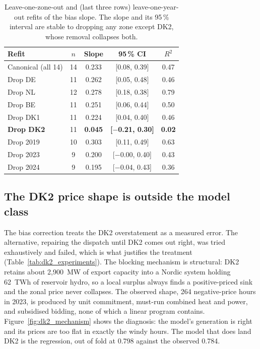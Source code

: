 \begin{table}[!htb]
\centering\small
\caption{Leave-one-zone-out and (last three rows) leave-one-year-out refits of
the bias slope. The slope and its 95\,\% interval are stable to dropping any zone
except DK2, whose removal collapses both.}
\label{tab:lozo}
\begin{tabular}{l c c c c}
\toprule
\textbf{Refit} & \textbf{$n$} & \textbf{Slope} & \textbf{95\,\% CI} &
\textbf{$R^2$} \\
\midrule
Canonical (all 14) & 14 & 0.233 & [0.08, 0.39] & 0.47 \\
Drop DE  & 11 & 0.262 & [0.05, 0.48] & 0.46 \\
Drop NL  & 12 & 0.278 & [0.18, 0.38] & 0.79 \\
Drop BE  & 11 & 0.251 & [0.06, 0.44] & 0.50 \\
Drop DK1 & 11 & 0.224 & [0.04, 0.40] & 0.46 \\
\textbf{Drop DK2} & 11 & \textbf{0.045} & \textbf{[$-$0.21, 0.30]} & \textbf{0.02} \\
\midrule
Drop 2019 & 10 & 0.303 & [0.11, 0.49] & 0.63 \\
Drop 2023 & 9 & 0.200 & [$-$0.00, 0.40] & 0.43 \\
Drop 2024 & 9 & 0.195 & [$-$0.04, 0.43] & 0.36 \\
\bottomrule
\end{tabular}
\end{table}


\subsection*{The DK2 price shape is outside the model class}

The bias correction treats the DK2 overstatement as a measured error. The
alternative, repairing the dispatch until DK2 comes out right, was tried
exhaustively and failed, which is what justifies the treatment
(Table~\ref{tab:dk2_experiments}). The blocking mechanism is structural: DK2
retains about 2,900~MW of export capacity into a Nordic system holding 62~TWh
of reservoir hydro, so a local surplus always finds a positive-priced sink and
the zonal price never collapses. The observed shape, 264 negative-price hours
in 2023, is produced by unit commitment, must-run combined heat and power, and
subsidised bidding, none of which a linear program contains.
Figure~\ref{fig:dk2_mechanism} shows the diagnosis: the model's generation is
right and its prices are too flat in exactly the windy hours. The model
that does land DK2 is the regression, out of fold at 0.798 against the
observed 0.784.

